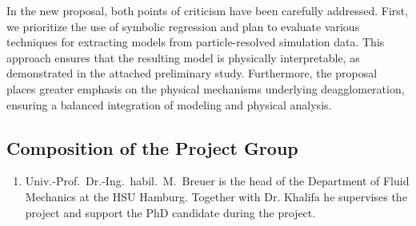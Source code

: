 \documentclass[11pt,a4paper,twoside]{scrartcl}
\begin{document}
\begin{enumerate}
In the new proposal, both points of criticism have been carefully addressed. 
First, we prioritize the use of symbolic regression and plan to evaluate 
various techniques for extracting models from particle-resolved simulation 
data. This
approach ensures that the resulting model is physically
interpretable, as demonstrated in the attached preliminary
study. Furthermore, the proposal places greater emphasis on the physical 
mechanisms underlying
deagglomeration, ensuring a balanced integration of modeling and
physical analysis.

\end{enumerate}
\subsection{Composition of the Project Group}


\begin{enumerate}
	
	
\item[]	Univ.-Prof.\ Dr.-Ing.\ habil.\ M.\ Breuer is the head of the
	Department of Fluid Mechanics at the HSU Hamburg. Together with Dr. Khalifa 
	he supervises the
	project and support the PhD candidate during the project.
	
\end{enumerate}

\end{document}
